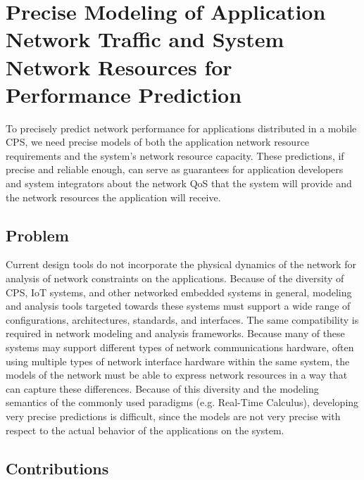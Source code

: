 \newpage
\section{Precise Modeling of Application Network Traffic and System Network Resources for Performance Prediction}
\label{sec:framework} 

To precisely predict network performance for applications distributed in a mobile CPS, we need precise models of both the application network resource requirements and the system's network resource capacity.  These predictions, if precise and reliable enough, can serve as guarantees for application developers and system integrators about the network QoS that the system will provide and the network resources the application will receive.  

\subsection{Problem}
Current design tools do not incorporate the physical dynamics of the network for analysis of network constraints on the applications. Because of the diversity of CPS, IoT systems, and other networked embedded systems in general, modeling and analysis tools targeted towards these systems must support a wide range of configurations, architectures, standards, and interfaces.  The same compatibility is required in network modeling and analysis frameworks.  Because many of these systems may support different types of network communications hardware, often using multiple types of network interface hardware within the same system, the models of the network must be able to express network resources in a way that can capture these differences.  Because of this diversity and the modeling semantics of the commonly used paradigms (e.g. Real-Time Calculus), developing very precise predictions is difficult, since the models are not very precise with respect to the actual behavior of the applications on the system.  

\subsection{Contributions}

